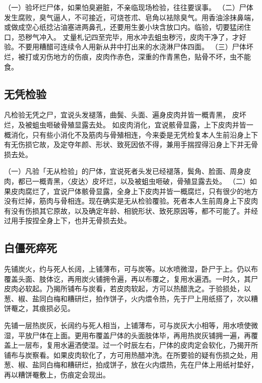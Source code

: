 \documentclass[12pt,UTF8]{ctexbook}
\begin{document}
（一）验坏烂尸体，如果怕臭避脏，不亲临现场检验，往往要误事。
（二）尸体发生腐败，臭气逼人，不可接近，可烧苍朮、皂角以袪除臭气。用香油涂抹鼻端，或做成空心纸捻沾油塞进两鼻孔，还要用生姜小块含放口内。临验，切要猛闭住口，恐秽气冲入。
丈量札记四至完毕，用水冲去蛆虫秽污，皮肉干净了，才好验。不要用糟醋可连续令人用新从井中打出来的水浇淋尸体四面。
（三）尸体坏烂，被打或刃伤地方的伤痕，皮肉作赤色，深重的作青黑色，贴骨不坏，虫不能食。


\chapter{无凭检验}

凡检验无凭之尸，宜说头发褪落，曲鬓、头面、遍身皮肉并皆一概青黑， 皮坏烂，及被蛆虫咂破骨殖显露去处。
如皮肉消化，宜说骸骨显露，上下皮肉并皆一概消化，只有些小消化不及筋肉与骨殖相连，今来委是无凭检复本人生前沿身上下有无伤损它故，及定夺年颜、形状、致死因依不得，兼用手揣捏得沿身上下并无骨损去处。


（一）凡验「无从检验」的尸体，宜说死者头发已经褪落，鬓角、脸面、周身皮肉，都已一概青黑，〈皮达〉皮坏烂，以及被蛆虫咂破，骨殖显露去处。
（二）如果皮肉腐烂了，宜说尸体骸骨显露，全身上下皮肉并皆一概腐烂，只有很少的地方没有烂掉，筋肉与骨相连。现在确实是无从检验覆验。死者本人生前周身上下皮肉有没有伤损其它原故，以及确定年龄、相貌形状、致死原因等，都不可能了。并经过用手按捏全身上下，也并无骨损去处。


\chapter{白僵死瘁死}

先铺炭火，约与死人长阔，上铺薄布，可与炭等。以水喷微湿，卧尸于上。仍以布覆盖头面、肢体讫，再用炭火铺拥令遍，再以布覆之，复用水遍洒。一时久，其尸皮肉必软起。乃揭所铺布与炭看，若皮肉软起，方可以热醋洗之。于验损处，以葱、椒、盐同白梅和糟研烂，拍作饼子，火内煨令热，先于尸上用纸搭了，次以糟饼罨之，其痕损必见。


先铺一层热炭灰，长阔约与死人相当，上铺薄布，可与炭灰大小相等，用水喷使微湿，平放尸体在上面。更用布覆盖尸体的头面肢体毕，再用热炭灰铺拥一遍，再覆盖上一层布，复用水遍洒使湿。过一个时辰左右，尸体的皮肉定会软化，乃揭开所铺布与炭察看。如果皮肉软化了，方可用热醋冲洗。在所要验的疑有伤损之处，用葱、椒、盐同白梅和糟研烂，拍成饼子，放在火内煨热，先在尸体上用纸衬垫好，再以糟饼罨敷上，伤痕定会现出。


\part{}
\end{document}
